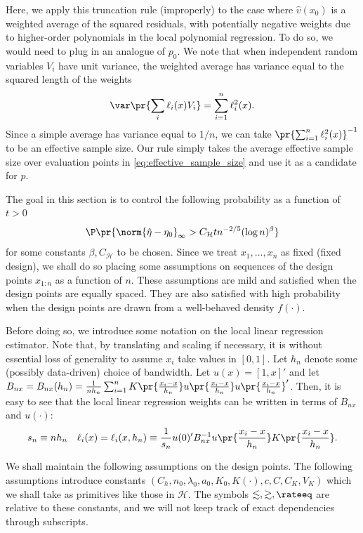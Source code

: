 \documentclass[12pt, reqno]{amsart}
\newcommand{\Hyperparams}{\mathcal{H}}
\numberwithin{equation}{section}
\begin{document}
\begin{refsection}
\begin{appendices}
\begin{rmksq}
  Here, we apply this truncation rule (improperly) to the case where $\hat v(x_0)$ is a
  weighted average of the squared residuals, with potentially negative weights due to
  higher-order polynomials in the local polynomial regression. To do so, we would need to
  plug
  in an analogue of $p_0$. We note that when independent random variables $V_i$ have unit
  variance, the weighted average
has variance equal to the squared length of the weights  \[
\var\pr{\sum_i \ell_i(x) V_i} = \sum_{i=1}^n \ell_i^2(x).
  \]
  Since a simple average has variance equal to $1/n$, we can take $\pr{\sum_{i=1}^n
  \ell_i^2(x)}^{-1}$ to be an effective sample size. Our rule simply takes the average
  effective sample size over evaluation points in \eqref{eq:effective_sample_size} and use
  it as a candidate for $p$.
\end{rmksq}


The goal in this section is to control the following probability as a function of $t > 0$
\[
\P\pr{\norm{\hat\eta - \eta_0}_\infty > C_\Hyperparams t n^{-2/5} (\log n)^\beta}
\]
for some constants $\beta, C_\Hyperparams$ to be chosen. Since we treat $x_{1},\ldots,
x_n$ as fixed (fixed design), we shall do so placing some assumptions on sequences of the
design points $x_{1:n}$ as a function of $n$. These assumptions are mild and satisfied
when the design points are equally spaced. They are also satisfied with high probability
when the design points are drawn from a well-behaved density $f(\cdot)$.

Before doing so, we introduce some notation on the local linear regression estimator. Note
that, by translating and scaling if necessary, it is without essential loss of generality
to assume $x_i$ take values in $[0,1]$. Let $h_n$ denote some (possibly data-driven) choice of bandwidth.
Let $u(x) = [1, x]'$ and let $B_{nx} = B_{nx}(h_n) = \frac{1}{n h_n} \sum_{i=1}^n K\pr{
\frac{x_i - x}{h_n}}
u\pr{\frac{x_i - x}{h_n}} u\pr{\frac{x_i - x}{h_n}}'$. Then, it is easy to see that the
local linear regression weights can be written in terms of $B_{nx}$ and $u(\cdot)$: \[
s_n \equiv nh_n \quad \ell_i(x) = \ell_i(x, h_n) \equiv \frac{1}{s_n} u(0)'B_{nx}^{-1} u
\pr{\frac{x_i - x}
{h_n}} K\pr{\frac{x_i - x}{h_n}}.
\]

We shall maintain the following assumptions on the design points. The following
assumptions introduce constants $(C_h, n_0, \lambda_0, a_0, K_0, K(\cdot), c, C, C_K,
V_K)$ which we shall take as primitives like those in $\mathcal H$. The symbols $\lesssim,
\gtrsim,
\rateeq$ are relative to these constants, and we will not keep track of exact
dependencies through subscripts.


\end{appendices}
\end{refsection}
\end{document}
